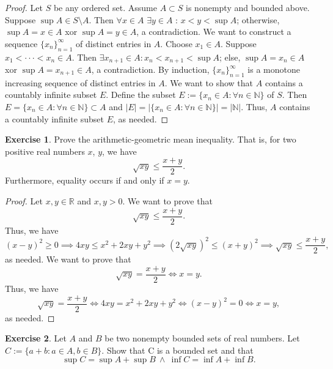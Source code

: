 \documentclass[12pt]{article}
\theoremstyle{definition}
\newtheorem{exercise}{Exercise}
\begin{document}
\begin{proof}
    Let $S$ be any ordered set. Assume $A \subset S$ is nonempty and bounded above. Suppose $\sup A \in S \setminus A$. Then $\forall x \in A$ $\exists y \in A$ : $x < y < \sup A$; otherwise, $\sup A = x \in A$ xor $\sup A = y \in A$, a contradiction. We want to construct a sequence $\{x_n\}_{n = 1}^{\infty}$ of distinct entries in $A$. Choose $x_1 \in A$. Suppose $x_1 < \cdot \cdot \cdot < x_n \in A$. Then $\exists x_{n+1} \in A : x_{n} < x_{n+1} < \sup A$; else, $\sup A = x_n \in A$ xor $\sup A = x_{n+1} \in A$, a contradiction. By induction, $\{x_n\}_{n = 1}^{\infty}$ is a monotone increasing sequence of distinct entries in $A$. We want to show that $A$ contains a countably infinite subset $E$. Define the subset $E := \{x_n \in A : \forall n \in \mathbb{N}\}$ of $S$. Then $E = \{x_n \in A : \forall n \in \mathbb{N}\} \subset A$ and $\vert E \vert = \vert \{x_n \in A : \forall n \in \mathbb{N}\} \vert = \vert \mathbb{N} \vert$. Thus, $A$ contains a countably infinite subset $E$, as needed.
\end{proof}

\begin{exercise}
    Prove the arithmetic-geometric mean inequality. That is, for two positive real numbers $x$, $y$, we have
    \[
        \sqrt{xy} \leq \frac{x + y}{2}.
    \]
    Furthermore, equality occurs if and only if $x = y$.
\end{exercise}

\begin{proof}
    Let $x,y \in \mathbb{R}$ and $x,y > 0$. We want to prove that
    \[
        \sqrt{xy} \leq \frac{x + y}{2}.
    \]
    Thus, we have
    \[
        (x - y)^2 \geq 0 \implies 4xy \leq x^2 + 2xy + y^2 \implies (2\sqrt{xy})^2 \leq (x + y)^2 \implies \sqrt{xy} \leq \frac{x + y}{2},
    \]
    as needed. We want to prove that
    \[
        \sqrt{xy} = \frac{x + y}{2} \iff x = y.
    \]
    Thus, we have
    \[
        \sqrt{xy} = \frac{x + y}{2} \iff 4xy = x^2 + 2xy + y^2 \iff (x - y)^2 = 0 \iff x = y,
    \]
    as needed.
\end{proof}

\begin{exercise}
    Let $A$ and $B$ be two nonempty bounded sets of real numbers. Let $C := \{a + b : a \in A, b \in B\}$. Show that C is a bounded set and that
    \[
        \sup C = \sup A + \sup B \ \land \ \inf C = \inf A + \inf B.
    \]
\end{exercise}
\end{document}
